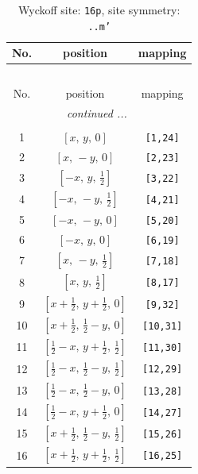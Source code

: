 \documentclass[fleqn,8pt]{jsarticle}
\begin{document}
\renewcommand{\arraystretch}{1.2}
\begin{longtable}{ccc}
\caption{Wyckoff site: {\tt 16p}, site symmetry: {\tt ..m'}}
 \\
 \hline \hline
No. & position & mapping \\ \hline \endfirsthead

\multicolumn{2}{l}{\tablename\ \thetable{}} \\
 \hline \hline
No. & position & mapping \\ \hline \endhead

 \hline \hline
\multicolumn{2}{r}{\footnotesize\it continued ...} \\ \endfoot

 \hline \hline
\multicolumn{2}{r}{} \\ \endlastfoot

1 & $\left[ x,\, y,\, 0 \right]$ & {\tt [1,24]} \\ \hline
2 & $\left[ x,\, - y,\, 0 \right]$ & {\tt [2,23]} \\ \hline
3 & $\left[ - x,\, y,\, \frac{1}{2} \right]$ & {\tt [3,22]} \\ \hline
4 & $\left[ - x,\, - y,\, \frac{1}{2} \right]$ & {\tt [4,21]} \\ \hline
5 & $\left[ - x,\, - y,\, 0 \right]$ & {\tt [5,20]} \\ \hline
6 & $\left[ - x,\, y,\, 0 \right]$ & {\tt [6,19]} \\ \hline
7 & $\left[ x,\, - y,\, \frac{1}{2} \right]$ & {\tt [7,18]} \\ \hline
8 & $\left[ x,\, y,\, \frac{1}{2} \right]$ & {\tt [8,17]} \\ \hline
9 & $\left[ x + \frac{1}{2},\, y + \frac{1}{2},\, 0 \right]$ & {\tt [9,32]} \\ \hline
10 & $\left[ x + \frac{1}{2},\, \frac{1}{2} - y,\, 0 \right]$ & {\tt [10,31]} \\ \hline
11 & $\left[ \frac{1}{2} - x,\, y + \frac{1}{2},\, \frac{1}{2} \right]$ & {\tt [11,30]} \\ \hline
12 & $\left[ \frac{1}{2} - x,\, \frac{1}{2} - y,\, \frac{1}{2} \right]$ & {\tt [12,29]} \\ \hline
13 & $\left[ \frac{1}{2} - x,\, \frac{1}{2} - y,\, 0 \right]$ & {\tt [13,28]} \\ \hline
14 & $\left[ \frac{1}{2} - x,\, y + \frac{1}{2},\, 0 \right]$ & {\tt [14,27]} \\ \hline
15 & $\left[ x + \frac{1}{2},\, \frac{1}{2} - y,\, \frac{1}{2} \right]$ & {\tt [15,26]} \\ \hline
16 & $\left[ x + \frac{1}{2},\, y + \frac{1}{2},\, \frac{1}{2} \right]$ & {\tt [16,25]} \\
\end{longtable}
\end{document}
